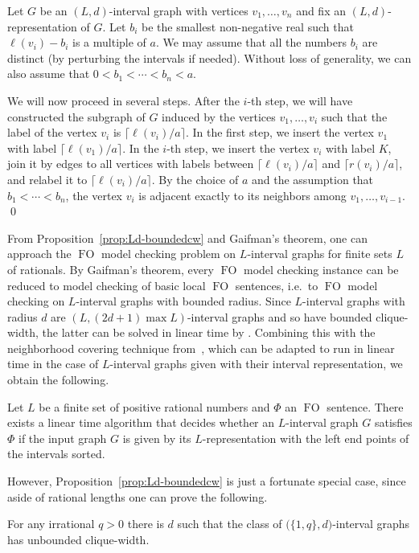 \documentclass{CSML}
\newcommand{\FO}{\ensuremath{\operatorname{FO}}\xspace}
\theoremstyle{plain}\newtheorem{claim}[thm]{Claim}
\begin{document}
Let $G$ be an $(L,d)$-interval graph with vertices $v_1,\ldots,v_n$ and
fix an $(L,d)$-representation of $G$. Let $b_i$ be the smallest
non-negative real such that $\ell(v_i)-b_i$ is a multiple of $a$.
We may assume that all the numbers $b_i$ are distinct (by perturbing the intervals if needed).
Without loss of generality, we can also assume that $0<b_1<\cdots<b_n<a$.

We will now proceed in several steps. After the $i$-th step,
we will have constructed the subgraph of $G$ induced
by the vertices $v_1,\ldots,v_i$ such that
the label of the vertex $v_i$ is $\lceil\ell(v_i)/a\rceil$.
In the first step, we insert the vertex $v_1$ with label $\lceil\ell(v_1)/a\rceil$.
In the $i$-th step, we insert the vertex $v_i$ with label $K$,
join it by edges to all vertices with labels between $\lceil\ell(v_i)/a\rceil$ and $\lceil r(v_i)/a\rceil$, and
relabel it to $\lceil\ell(v_i)/a\rceil$.
By the choice of $a$ and the assumption that $b_1<\cdots<b_n$,
the vertex $v_i$ is adjacent exactly to its neighbors among $v_1,\ldots,v_{i-1}$. 
\qed

From Proposition~\ref{prop:Ld-boundedcw} and Gaifman's theorem,
one can approach  the \FO model checking problem on $L$-interval graphs
for finite sets $L$ of rationals.
By Gaifman's theorem, every \FO model checking instance can be reduced to
model checking of basic local \FO sentences, i.e.~to \FO model checking on
$L$-interval graphs with bounded radius.
Since $L$-interval graphs with radius $d$ are $(L,(2d+1)\max L)$-interval graphs and so have bounded clique-width,
the latter can be solved in linear time by \cite{cmr00}.
Combining this with the neighborhood covering technique from~\cite{fg01},
which can be adapted to run in linear time in the case of $L$-interval graphs given with their interval representation,
we obtain the following.

\begin{cor}
\label{cor:rationalFO}
Let $L$ be a finite set of positive rational numbers and $\Phi$ an \FO sentence.
There exists a linear time algorithm that decides whether 
an $L$-interval graph $G$ satisfies $\Phi$
if the input graph $G$ is given by its $L$-representation
with the left end points of the intervals sorted.
\end{cor}

However, Proposition~\ref{prop:Ld-boundedcw} is just a fortunate special case, 
since aside of rational lengths one can prove the following.

\begin{prop}
\label{prop:1qcw-unbounded}
For any irrational $q>0$ there is $d$ such that the class of
$\big(\{1,q\},d\big)$-interval graphs has unbounded clique-width.
\end{prop}
\end{document}
